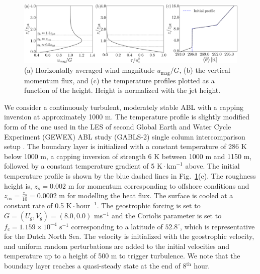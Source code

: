 \documentclass[%
 aip,
 amsmath,amssymb,
reprint,
twocolumn,%
author-numerical,%
]{revtex4-1}
\begin{document}
\begin{figure}
 \centering
 \includegraphics[width=\linewidth]{fig2}
 \caption{(a) Horizontally averaged wind magnitude $u_\text{mag}/G$, (b) the vertical momentum flux, and (c) the temperature profiles plotted as a function of the height. Height is normalized with the jet height.}
 \label{fig2}
\end{figure}
\vspace{-5mm}
{\color{black} We consider a continuously turbulent, moderately stable ABL with a capping inversion at approximately 1000 m. The temperature profile is slightly modified form of the one used in the LES of second Global Earth and Water Cycle Experiment (GEWEX) ABL study (GABLS-2) single column intercomparison setup \cite{kum10}. The boundary layer is initialized with a constant temperature of 286 $\text{K}$ below 1000 $\text{m}$, a capping inversion of strength 6 $\text{K}$ between 1000 m and 1150 m, followed by a constant temperature gradient of 5 $\text{K}\cdot\text{km}^{-1}$ above. The initial temperature profile is shown by the blue dashed lines in Fig.\ \ref{fig2}(c). The roughness height is, $z_o=0.002$ m for momentum corresponding to offshore conditions \cite{dor15} and $z_{os} = \frac{z_o}{10}= 0.0002$ m \cite{bru82} for modelling the heat flux. The surface is cooled at a constant rate of 0.5 $\text{K}\cdot\text{hour}^{-1}$. The geostrophic forcing is set to $G=(U_g,V_g)=(8.0,0.0)$ $\text{m}\text{s}^{-1}$ and the Coriolis parameter is set to $f_c=1.159\times10^{-4}$ $\text{s}^{-1}$ corresponding to a latitude of $52.8^\circ$, which is representative for the Dutch North Sea. The velocity is initialized with the geostrophic velocity, and uniform random perturbations are added to the initial velocities and temperature up to a height of 500 m to trigger turbulence. We note that the boundary layer reaches a quasi-steady state at the end of 8$^\text{th}$ hour.}\\
\end{document}
